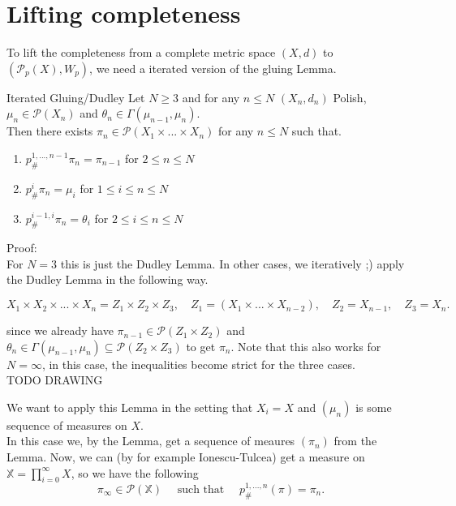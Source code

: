 \documentclass[15pt]{article}
\begin{document}
\section*{Lifting completeness}

To lift the completeness from a complete metric space $(X,d)$ to $(\mathcal{P}_p(X), W_p)$, we need a iterated version of the gluing Lemma.

\begin{lemma}{Iterated Gluing/Dudley}{}
  Let $N \geq 3$ and for any $n \leq N$ $(X_n,d_n)$ Polish, $\mu_n \in \mathcal{P}(X_n)$ and $\theta_n \in \Gamma(\mu_{n-1},\mu_n)$. \\ 
  Then there exists $\pi_n \in \mathcal{P}(X_1\times ... \times X_n)$ for any $n \leq N$ such that.
  \begin{enumerate}
      \item $p^{1,...,n-1}_{\#} \pi_n = \pi_{n-1}$ for $2 \leq n \leq N$
      \item $p^i_{\#} \pi_n = \mu_i$ for $1 \leq i \leq n \leq N$
      \item $p^{i-1,i}_{\#} \pi_n = \theta_i$ for $2 \leq i\leq n \leq N$
  \end{enumerate}
\end{lemma}

Proof: 
\vspace{0.3cm} \\

For $N = 3$ this is just the Dudley Lemma. In other cases, we iteratively ;) apply the Dudley Lemma in the following way. 

$$X_1 \times X_2 \times ... \times X_n = Z_1 \times Z_2 \times Z_3, \quad Z_1 = (X_1 \times ... \times X_{n-2}), \quad Z_2 = X_{n-1}, \quad Z_3 = X_n.$$

since we already have $\pi_{n-1} \in \mathcal{P}(Z_1 \times Z_2)$ and $\theta_n \in \Gamma(\mu_{n-1}, \mu_{n}) \subseteq \mathcal{P}(Z_2 \times Z_3)$ to get $\pi_n$. Note that this also works for $N = \infty$, in this case, the inequalities become strict for the three cases. \\
TODO DRAWING

\bigbreak

We want to apply this Lemma in the setting that $X_i =X$ and $(\mu_n)$ is some sequence of measures on $X$. \\
In this case we, by the Lemma, get a sequence of meaures $(\pi_n)$ from the Lemma. Now, we can (by for example Ionescu-Tulcea) get a measure on $\mathbb{X} = \prod_{i = 0}^\infty X$, so we have the following $$\pi_\infty \in \mathcal{P}(\mathbb{X}) \quad \text{ such that } \quad p^{1,...,n}_{\#}(\pi) = \pi_n.$$
\end{document}
